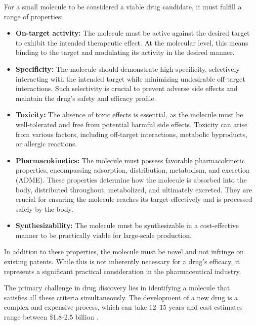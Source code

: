 For a small molecule to be considered a viable drug candidate, it must fulfill a range of properties:
\begin{itemize}
      \item \textbf{On-target activity:} The molecule must be active against the desired target to exhibit
            the intended therapeutic effect. At the molecular level, this means binding to the target and
            modulating its activity in the desired manner.
      \item \textbf{Specificity:} The molecule should demonstrate high specificity, selectively
            interacting with the intended target while minimizing undesirable off-target interactions. Such
            selectivity is crucial to prevent adverse side effects and maintain the drug's safety and efficacy
            profile.
      \item \textbf{Toxicity:} The absence of toxic effects is essential, as the molecule must be
            well-tolerated and free from potential harmful side effects. Toxicity can arise from various
            factors, including off-target interactions, metabolic byproducts, or allergic reactions.
      \item \textbf{Pharmacokinetics:} The molecule must possess favorable pharmacokinetic properties,
            encompassing adsorption, distribution, metabolism, and excretion (ADME). These properties determine
            how the molecule is absorbed into the body, distributed throughout, metabolized, and ultimately
            excreted. They are crucial for ensuring the molecule reaches its target effectively and is processed
            safely by the body.
      \item \textbf{Synthesizability:} The molecule must be synthesizable in a cost-effective manner to be
            practically viable for large-scale production.
\end{itemize}

In addition to these properties, the molecule must be novel and not infringe on existing patents.
While this is not inherently necessary for a drug's efficacy, it represents a significant practical
consideration in the pharmaceutical industry.

The primary challenge in drug discovery lies in identifying a molecule that satisfies all these
criteria simultaneously. The development of a new drug is a complex and expensive process, which can
take 12--15 years and cost estimates range between \$1.8-2.5 billion \citep{paulHowImproveProductivity2010,dimasiInnovationPharmaceuticalIndustry2016}.

